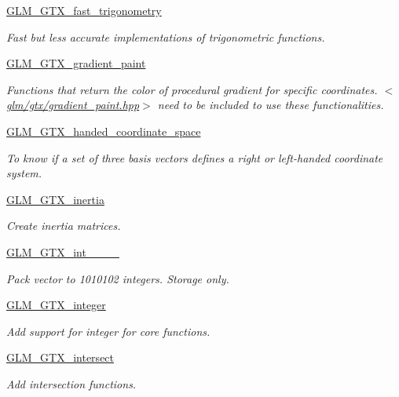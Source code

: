 \begin{DoxyCompactItemize}
\hyperlink{group__gtx__fast__trigonometry}{G\+L\+M\+\_\+\+G\+T\+X\+\_\+fast\+\_\+trigonometry}
\begin{DoxyCompactList}\small\item\em Fast but less accurate implementations of trigonometric functions. \end{DoxyCompactList}\item 
\hyperlink{group__gtx__gradient__paint}{G\+L\+M\+\_\+\+G\+T\+X\+\_\+gradient\+\_\+paint}
\begin{DoxyCompactList}\small\item\em Functions that return the color of procedural gradient for specific coordinates. $<$\hyperlink{gradient__paint_8hpp}{glm/gtx/gradient\+\_\+paint.\+hpp}$>$ need to be included to use these functionalities. \end{DoxyCompactList}\item 
\hyperlink{group__gtx__handed__coordinate__space}{G\+L\+M\+\_\+\+G\+T\+X\+\_\+handed\+\_\+coordinate\+\_\+space}
\begin{DoxyCompactList}\small\item\em To know if a set of three basis vectors defines a right or left-\/handed coordinate system. \end{DoxyCompactList}\item 
\hyperlink{group__gtx__inertia}{G\+L\+M\+\_\+\+G\+T\+X\+\_\+inertia}
\begin{DoxyCompactList}\small\item\em Create inertia matrices. \end{DoxyCompactList}\item 
\hyperlink{group__gtx__int__10__10__10__2}{G\+L\+M\+\_\+\+G\+T\+X\+\_\+int\+\_\+\_\+\_\+\_}
\begin{DoxyCompactList}\small\item\em Pack vector to 1010102 integers. Storage only. \end{DoxyCompactList}\item 
\hyperlink{group__gtx__integer}{G\+L\+M\+\_\+\+G\+T\+X\+\_\+integer}
\begin{DoxyCompactList}\small\item\em Add support for integer for core functions. \end{DoxyCompactList}\item 
\hyperlink{group__gtx__intersect}{G\+L\+M\+\_\+\+G\+T\+X\+\_\+intersect}
\begin{DoxyCompactList}\small\item\em Add intersection functions. \end{DoxyCompactList}\item 

\end{DoxyCompactItemize}
